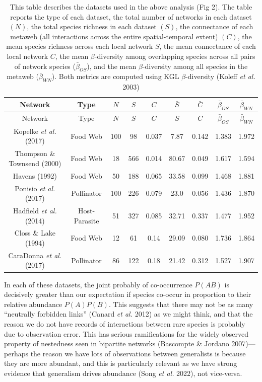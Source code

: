 \documentclass[11pt]{article}
\begin{document}
\hypertarget{tbl:id}{}
\begin{longtable}[]{@{}ccccccccc@{}}
\caption{\label{tbl:id}This table describes the datasets used in the
above analysis (Fig 2). The table reports the type of each dataset, the
total number of networks in each dataset \((N)\), the total species
richness in each dataset \((S)\), the connectance of each metaweb (all
interactions across the entire spatial-temporal extent) \((C)\), the
mean species richness across each local network \(S\), the mean
connectance of each local network \(C\), the mean \(\beta\)-diversity
among overlapping species across all pairs of network species
(\(\bar{\beta}_{OS}\)), and the mean \(\beta\)-diversity among all
species in the metaweb (\(\bar{\beta}_{WN}\)). Both metrics are computed
using KGL \(\beta\)-diversity (Koleff \emph{et al.}
2003)}\tabularnewline
\toprule
Network & Type & \(N\) & \(S\) & \(C\) & \(\bar{S}\) & \(\bar{C}\) &
\(\bar{\beta}_{OS}\) & \(\bar{\beta}_{WN}\)\tabularnewline
\midrule
\endfirsthead
\toprule
Network & Type & \(N\) & \(S\) & \(C\) & \(\bar{S}\) & \(\bar{C}\) &
\(\bar{\beta}_{OS}\) & \(\bar{\beta}_{WN}\)\tabularnewline
\midrule
\endhead
Kopelke \emph{et al.} (2017) & Food Web & 100 & 98 & 0.037 & 7.87 &
0.142 & 1.383 & 1.972\tabularnewline
Thompson \& Townsend (2000) & Food Web & 18 & 566 & 0.014 & 80.67 &
0.049 & 1.617 & 1.594\tabularnewline
Havens (1992) & Food Web & 50 & 188 & 0.065 & 33.58 & 0.099 & 1.468 &
1.881\tabularnewline
Ponisio \emph{et al.} (2017) & Pollinator & 100 & 226 & 0.079 & 23.0 &
0.056 & 1.436 & 1.870\tabularnewline
Hadfield \emph{et al.} (2014) & Host-Parasite & 51 & 327 & 0.085 & 32.71
& 0.337 & 1.477 & 1.952\tabularnewline
Closs \& Lake (1994) & Food Web & 12 & 61 & 0.14 & 29.09 & 0.080 & 1.736
& 1.864\tabularnewline
CaraDonna \emph{et al.} (2017) & Pollinator & 86 & 122 & 0.18 & 21.42 &
0.312 & 1.527 & 1.907\tabularnewline
\bottomrule
\end{longtable}

In each of these datasets, the joint probably of co-occurrence \(P(AB)\)
is decisively greater than our expectation if species co-occur in
proportion to their relative abundance \(P(A)P(B)\). This suggests that
there may not be as many ``neutrally forbidden links'' (Canard \emph{et
al.} 2012) as we might think, and that the reason we do not have records
of interactions between rare species is probably due to observation
error. This has serious ramifications for the widely observed property
of nestedness seen in bipartite networks (Bascompte \& Jordano
2007)---perhaps the reason we have lots of observations between
generalists is because they are more abundant, and this is particularly
relevant as we have strong evidence that generalism drives abundance
(Song \emph{et al.} 2022), not vice-versa.
\end{document}
